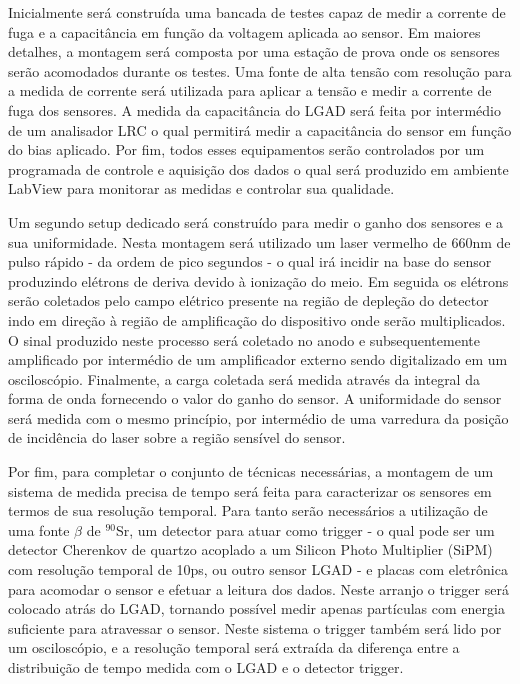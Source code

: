 \thispagestyle{plain}
Inicialmente será construída uma bancada de testes capaz de medir a corrente de fuga e a capacitância em função da voltagem aplicada ao sensor. Em maiores detalhes, a montagem será composta por uma estação de prova onde os sensores serão acomodados durante os testes. Uma fonte de alta tensão com resolução para a medida de corrente será utilizada para aplicar a tensão e medir a corrente de fuga dos sensores. A medida da capacitância do LGAD será feita por intermédio de um analisador LRC o qual permitirá medir a capacitância do sensor em função do bias aplicado. Por fim, todos esses equipamentos serão controlados por um programada de controle e aquisição dos dados o qual será produzido em ambiente LabView para monitorar as medidas e controlar sua qualidade.

Um segundo setup dedicado será construído para medir o ganho dos sensores e a sua uniformidade. Nesta montagem será utilizado um laser vermelho de 660nm de pulso rápido - da ordem de pico segundos - o qual irá incidir na base do sensor produzindo elétrons de deriva devido à ionização do meio. Em seguida os elétrons serão coletados pelo campo elétrico presente na região de depleção do detector indo em direção à região de amplificação do dispositivo onde serão multiplicados. O sinal produzido neste processo será coletado no anodo e subsequentemente amplificado por intermédio de um amplificador externo sendo digitalizado em um osciloscópio. Finalmente, a carga coletada será medida através da integral da forma de onda fornecendo o valor do ganho do sensor. A uniformidade do sensor será medida com o mesmo princípio, por intermédio de uma varredura da posição de incidência do laser sobre a região sensível do sensor.

\thispagestyle{plain}
Por fim, para completar o conjunto de técnicas necessárias, a montagem de um sistema de medida precisa de tempo será feita para caracterizar os sensores em termos de sua resolução temporal. Para tanto serão necessários a utilização de uma fonte $\beta$ de $^{90}$Sr, um detector para atuar como trigger - o qual pode ser um detector Cherenkov de quartzo acoplado a um Silicon Photo Multiplier (SiPM) com resolução temporal de 10ps, ou outro sensor LGAD - e placas com eletrônica para acomodar o sensor e efetuar a leitura dos dados. Neste arranjo o trigger será colocado atrás do LGAD, tornando possível medir apenas partículas com energia suficiente para atravessar o sensor. Neste sistema o trigger também será lido por um osciloscópio, e a resolução temporal será extraída da diferença entre a distribuição de tempo medida com o LGAD e o detector trigger.

